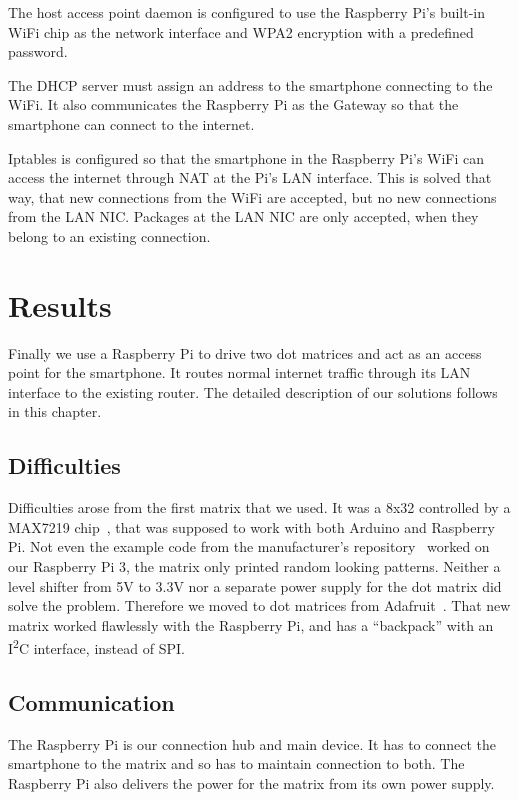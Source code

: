 \documentclass[conference]{IEEEtran}
\begin{document}
The host access point daemon is configured to use the Raspberry Pi's built-in WiFi chip as the network interface and WPA2  encryption with a predefined password.

The DHCP server must assign an address to the smartphone connecting to the WiFi. It also communicates the Raspberry Pi as the Gateway so that the smartphone can connect to the internet.

Iptables is configured so that the smartphone in the Raspberry Pi's WiFi can access the internet through NAT at the Pi's LAN interface. This is solved that way, that new connections from the WiFi are accepted, but no new connections from the LAN NIC. Packages at the LAN NIC are only accepted, when they belong to an existing connection.


\section{Results}
Finally we use a Raspberry Pi to drive two dot matrices and act as an access point for the smartphone. It routes normal internet traffic through its LAN interface to the existing router. The detailed description of our solutions follows in this chapter.

\subsection{Difficulties}
Difficulties arose from the first matrix that we used. It was a 8x32 controlled by a MAX7219 chip~\cite{azdelivery464}, that was supposed to work with both Arduino and Raspberry Pi. Not even the example code from the manufacturer's repository~\cite{azdelivery464} worked on our Raspberry Pi 3, the matrix only printed random looking patterns. Neither a level shifter from 5V to 3.3V nor a separate power supply for the dot matrix did solve the problem. Therefore we moved to dot matrices from Adafruit~\cite{adafruit88}. That new matrix worked flawlessly with the Raspberry Pi, and has a ``backpack'' with an I\textsuperscript{2}C interface, instead of SPI.

\subsection{Communication}
The Raspberry Pi is our connection hub and main device. It has to connect the smartphone to the matrix and so has to maintain connection to both. The Raspberry Pi also delivers the power for the matrix from its own power supply.
\end{document}
